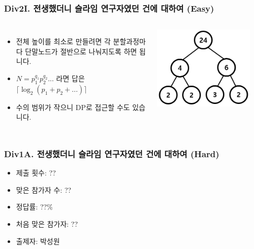 \documentclass[xetex]{beamer}
\begin{document}
\begin{frame}
  \frametitle{Div2I. 전생했더니 슬라임 연구자였던 건에 대하여 (Easy)}
  \begin{columns}
      \begin{itemize}
        \item 전체 높이를 최소로 만들려면 각 분할과정마다 단말노드가 절반으로 나눠지도록 하면 됩니다.
        \item $N = p_1^{q_1} p_2^{q_2} ...$ 라면 답은 $\lceil \log_2(p_1 + p_2 + ...) \rceil$
        \item 수의 범위가 작으니 DP로 접근할 수도 있습니다.
      \end{itemize}
      \includegraphics[width=0.9\textwidth]{slime-sol-1.png}
  \end{columns}
\end{frame}

\begin{frame}
  \frametitle{Div1A. 전생했더니 슬라임 연구자였던 건에 대하여 (Hard)}
  \begin{itemize}
    \item 제출 횟수: ??
    \item 맞은 참가자 수: ??
    \item 정답률: ??\%
    \item 처음 맞은 참가자: ??
    \item 출제자: 박성원
  \end{itemize}
\end{frame}
\end{document}
